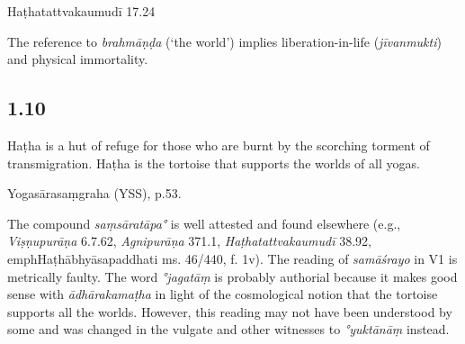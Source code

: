 \begin{ekdosis}
\begin{testimonia}[hp01_009]
Haṭhatattvakaumudī 17.24

\begin{versinnote}
\end{versinnote}

\end{testimonia}

\begin{philcomm}[hp01_009]        
The reference to \emph{brahmāṇḍa} (‘the world’) implies liberation-in-life (\emph{jīvanmukti}) and physical immortality.  
\end{philcomm}

\subsection*{1.10}
\begin{translation}[hp01_010]
Haṭha is a hut of refuge for those who are burnt by the scorching torment of transmigration. Haṭha is the tortoise that supports the worlds of all yogas.
\end{translation}

\begin{testimonia}[hp01_010]
Yogasārasaṃgraha (YSS), p.53.

\begin{versinnote}
\end{versinnote}

\end{testimonia}

\begin{philcomm}[hp01_010] 
The compound \emph{saṃsāratāpa°} is well attested and found elsewhere (e.g., \emph{Viṣṇupurāṇa} 6.7.62, \emph{Agnipurāṇa} 371.1, \emph{Haṭhatattvakaumudī} 38.92, emph{Haṭhābhyāsapaddhati} ms. 46/440, f. 1v). The reading of \emph{samāśrayo} in V1 is metrically faulty. The word \emph{°jagatāṃ} is probably authorial because it makes good sense with  \emph{ādhārakamaṭha} in light of the cosmological notion that the tortoise supports all the worlds. However, this reading may not have been understood by some and was changed in the vulgate and other witnesses to \emph{°yuktānāṃ} instead.      
\end{philcomm}


\end{ekdosis}
